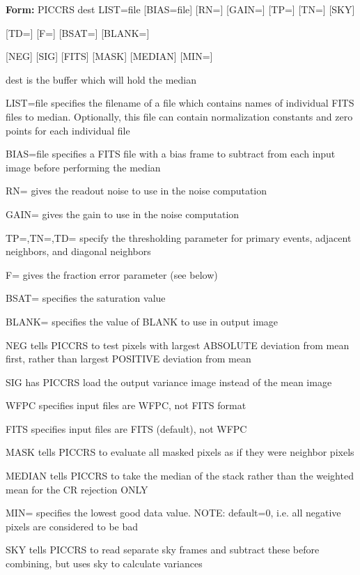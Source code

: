 \begin{command}
  \item[\textbf{Form: }PICCRS dest LIST=file {[BIAS=file]} {[RN=]} {[GAIN=]} 
       {[TP=]} {[TN=]} {[SKY]}\hfill]{}
  \item{{[TD=]} {[F=]} {[BSAT=]} {[BLANK=]} }
  \item{{[NEG]} {[SIG]} {[FITS]} {[MASK]} {[MEDIAN]} {[MIN=]}}
  \item[dest]{is the buffer which will hold the median}
  \item[LIST=file]{specifies the filename of a file which contains
       names of individual FITS files to median. Optionally,
       this file can contain normalization constants and
       zero points for each individual file}
  \item[BIAS=file]{specifies a FITS file with a bias frame to subtract
       from each input image before performing the median}
  \item[RN=]{gives the readout noise to use in the noise computation}
  \item[GAIN=]{gives the gain to use in the noise computation}
  \item[TP=,TN=,TD=]{specify the thresholding parameter for primary events,
                        adjacent neighbors, and diagonal neighbors}
  \item[F=]{gives the fraction error parameter (see below) }
  \item[BSAT=]{specifies the saturation value}
  \item[BLANK=]{specifies the value of BLANK to use in output image}
  \item[NEG]{tells PICCRS to test pixels with largest ABSOLUTE
       deviation from mean first, rather than largest
       POSITIVE deviation from mean}
  \item[SIG]{has PICCRS load the output variance image instead of 
       the mean image}
  \item[WFPC]{specifies input files are WFPC, not FITS format}
  \item[FITS]{specifies input files are FITS (default), not WFPC }
  \item[MASK]{tells PICCRS to evaluate all masked pixels as if
                        they were neighbor pixels}
  \item[MEDIAN]{tells PICCRS to take the median of the stack rather
                        than the weighted mean for the CR rejection ONLY}
  \item[MIN=]{specifies the lowest good data value. NOTE: default=0,
                        i.e. all negative pixels are considered to be bad}
  \item[SKY]{tells PICCRS to read separate sky frames and subtract these
            before combining, but uses sky to calculate variances}
\end{command}

